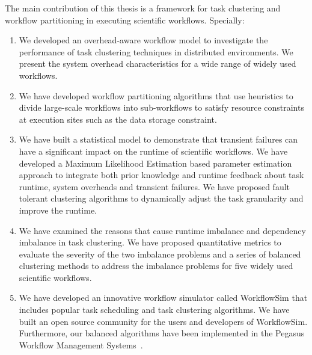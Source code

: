 The main contribution of this thesis is a framework for task clustering and workflow partitioning in executing scientific workflows. Specially:
\begin{enumerate}
\item We developed an overhead-aware workflow model to investigate the performance of task clustering techniques in distributed environments. We present the system overhead characteristics for a wide range of widely used workflows.
\item We have developed workflow partitioning algorithms that use heuristics to divide large-scale workflows into sub-workflows to satisfy resource constraints at execution sites such as the data storage constraint. 
\item We have built a statistical model to demonstrate that transient failures can have a significant impact on the runtime of scientific workflows. We have developed a Maximum Likelihood Estimation based parameter estimation approach to integrate both prior knowledge and runtime feedback about task runtime, system overheads and transient failures. We have proposed fault tolerant clustering algorithms to dynamically adjust the task granularity and improve the runtime. 
\item We have examined the reasons that cause runtime imbalance and dependency imbalance in task clustering. We have proposed quantitative metrics to evaluate the severity of the two imbalance problems and a series of balanced clustering methods to address the imbalance problems for five widely used scientific workflows. 
\item We have developed an innovative workflow simulator called WorkflowSim that includes popular task scheduling and task clustering algorithms. 
We have built an open source community for the users and developers of WorkflowSim. Furthermore, our balanced algorithms have been implemented in the Pegasus Workflow Management Systems~\cite{Deelman2014}. 
\end{enumerate}
 

